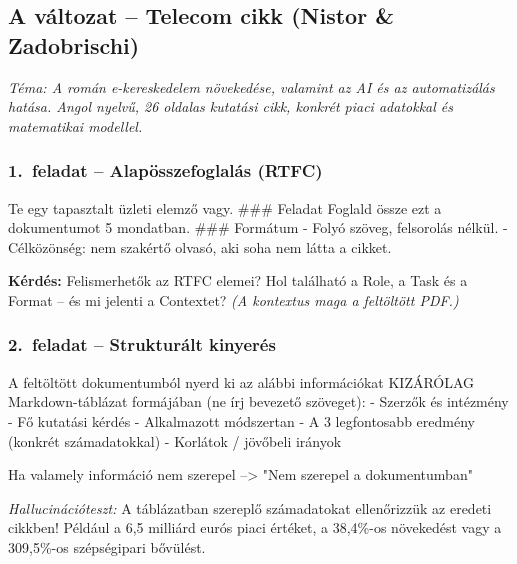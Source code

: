 \documentclass[11pt,a4paper]{article}
\begin{document}
\subsection{A változat -- Telecom cikk (Nistor \& Zadobrischi)}

\noindent\textit{Téma: A román e-kereskedelem növekedése, valamint az AI és az automatizálás hatása.
Angol nyelvű, 26 oldalas kutatási cikk, konkrét piaci adatokkal
és matematikai modellel.}

\bigskip

\subsubsection*{1.\ feladat -- Alapösszefoglalás (RTFC)}

\begin{prompt}
Te egy tapasztalt üzleti elemző vagy.
### Feladat
Foglald össze ezt a dokumentumot 5 mondatban.
### Formátum
- Folyó szöveg, felsorolás nélkül.
- Célközönség: nem szakértő olvasó, aki soha nem látta a cikket.
\end{prompt}

\noindent\textbf{Kérdés:} Felismerhetők az RTFC elemei?
Hol található a Role, a Task és a Format -- és mi jelenti a Contextet?
\textit{(A kontextus maga a feltöltött PDF.)}

\bigskip

\subsubsection*{2.\ feladat -- Strukturált kinyerés}

\begin{prompt}
A feltöltött dokumentumból nyerd ki az alábbi információkat
KIZÁRÓLAG Markdown-táblázat formájában (ne írj bevezető szöveget):
- Szerzők és intézmény
- Fő kutatási kérdés
- Alkalmazott módszertan
- A 3 legfontosabb eredmény (konkrét számadatokkal)
- Korlátok / jövőbeli irányok

Ha valamely információ nem szerepel --> "Nem szerepel a dokumentumban"
\end{prompt}

\noindent\textit{Hallucinációteszt:} A táblázatban szereplő számadatokat
ellenőrizzük az eredeti cikkben! Például a 6,5 milliárd eurós piaci értéket,
a 38,4\%-os növekedést vagy a 309,5\%-os szépségipari bővülést.
\end{document}
